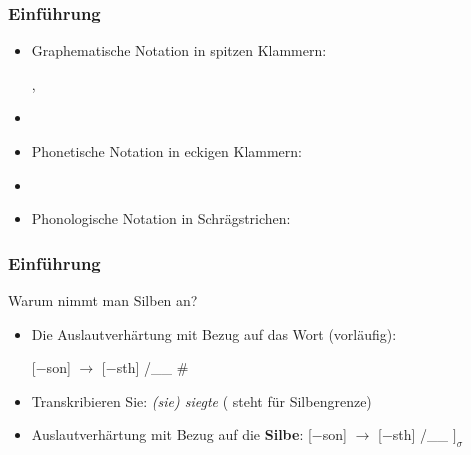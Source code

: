 \begin{frame}
\frametitle{Einführung}


\begin{itemize}
	\item Graphematische Notation in spitzen Klammern: 
	
	  \ea
          , 
          \z
          
	\item[]	
	\item Phonetische Notation in eckigen Klammern:
	
	  \ea
          \textipa{[nO5t.vInt]}
	  \z
          
	\item[]
	\item Phonologische Notation in Schrägstrichen:
	
	  \ea
	  \z
\end{itemize}

\end{frame}



\begin{frame}
\frametitle{Einführung}


Warum nimmt man Silben an?

\begin{itemize}
	\item Die Auslautverhärtung mit Bezug auf das Wort (vorläufig):
	
	  \ea
             {}[$-$son] $\rightarrow$ [$-$sth] /\_\_ \#
	     \z
	\item Transkribieren Sie: \emph{(sie) siegte}
\pause	
\ea
\textipa{[zi:k . t@]} ( steht für Silbengrenze)
\z

\pause
	\eal 
	\ex \textipa{[St\textscr e:p.za:m]} \vs \textipa{[St\textscr e:.b5]}
	\ex {} \vs \textipa{[bUn.d@s]}
	\ex \textipa{[bi:k.za:m]} \vs \textipa{[bi:.g@n]}
	\ex \textipa{[le:s.b5]} \vs \textipa{[le:.z@n]}
        \zl
        
	\item Auslautverhärtung mit Bezug auf die \textbf{Silbe}:
	  \ea
             {}[$-$son] $\rightarrow$ [$-$sth] /\_\_ $]_{\sigma}$
	  \z	
\end{itemize}


\end{frame}




